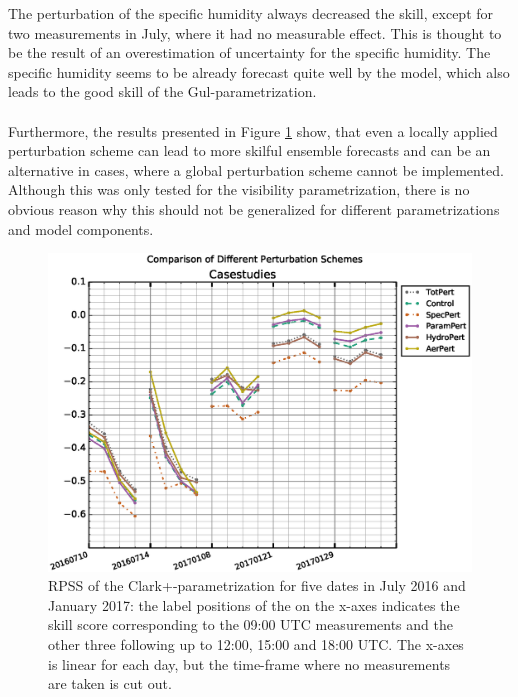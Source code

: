 The perturbation of the specific humidity always decreased the skill, except for two measurements in July, where it had no measurable effect. This is thought to be the result of an overestimation of uncertainty for the specific humidity. The specific humidity seems to be already forecast quite well by the model, which also leads to the good skill of the Gul-parametrization. \\ \\
Furthermore, the results presented in Figure \ref{fig:casestudies} show, that even a locally applied perturbation scheme can lead to more skilful ensemble forecasts and can be an alternative in cases, where a global perturbation scheme cannot be implemented. Although this was only tested for the visibility parametrization, there is no obvious reason why this should not be generalized for different parametrizations and model components.
\begin{figure}[h]
    \centering
    \includegraphics[width=\textwidth]{graphics/results/RPS-Casestudies.eps}
    \caption[Case studies of Different Perturbation Schemes]{RPSS  of the Clark+-parametrization for five dates in July 2016 and January 2017: the label positions of the on the x-axes indicates the skill score corresponding to the 09:00 UTC measurements and the other three following up  to 12:00, 15:00 and 18:00 UTC. The x-axes is linear for each day, but the time-frame where no measurements are taken is cut out. }
    \label{fig:casestudies}
\end{figure}
\FloatBarrier


